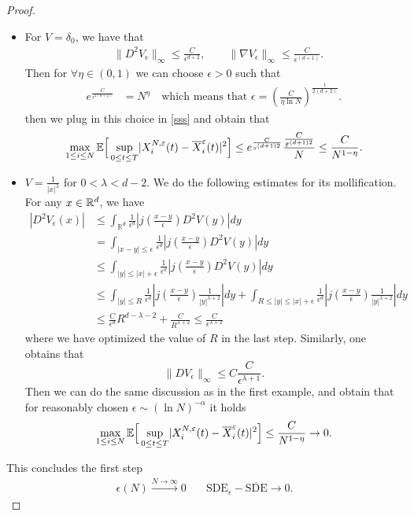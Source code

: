 \begin{proof}
\begin{itemize}
  \item For $V=\delta_0$, we have that 
 \begin{align*}
  &\|D^2 V_{\epsilon}\|_{\infty} \le  \frac{C}{\epsilon^{d+2}},\qquad\|\nabla V_{\epsilon}\|_{\infty} \le  \frac{C}{\epsilon ^{(d+1)} }
 .\end{align*}
 Then for $ \forall \eta  \in  (0,1)$ we can choose $\epsilon>0$ such that
  \begin{align*}
   e^{\frac{C}{\epsilon ^{2(d+2)} }} &= N^{\eta} \quad \mbox{which means that }
   \epsilon = (\frac{C}{\eta  \ln  N})^{\frac{1}{2(d+2)}}  
 .\end{align*}
 then we plug in this choice in \autoref{sss} and obtain that
 \begin{align*}
 \max_{1 \le i \le N}\mathbb{E}\Big[\sup_{0\leq t\leq T}\lvert X_i^{N,\varepsilon}(t) - \overline{X}_{i}^{\varepsilon}(t)\rvert^2 \Big ] \le  e^{\frac{C}{\varepsilon ^{(d+1)2} }} \frac{\frac{C}{\varepsilon ^{(d+1)2} }}{N}  \le \frac{C}{N^{1-\eta } }
 .\end{align*}
\item $V=\frac{1}{|x|^\lambda}$ for $0<\lambda<d-2$. We do the following estimates for its mollification. For any $x\in\mathbb{R}^d$, we have
\begin{align*}
|D^2 V_\epsilon(x)| &\leq \int_{\mathbb{R}^{d} }\frac{1}{\epsilon^{d}}|j(\frac{x-y}{\epsilon})D^2V(y)| dy\\
&=\int_{|x-y|\leq \epsilon }\frac{1}{\epsilon^{d}}|j(\frac{x-y}{\epsilon})D^2V(y)| dy\\
&\leq \int_{|y|\leq |x|+\epsilon }\frac{1}{\epsilon^{d}}|j(\frac{x-y}{\epsilon})D^2V(y)| dy\\
&\leq \int_{|y|\leq R}\frac{1}{\epsilon^{d}}|j(\frac{x-y}{\epsilon})\frac{1}{|y|^{\lambda+2}}| dy+\int_{R\leq |y|\leq |x|+\epsilon }\frac{1}{\epsilon^{d}}|j(\frac{x-y}{\epsilon})\frac{1}{|y|^{\lambda+2}}| dy\\
&\leq \frac{C}{\epsilon^{d}} R^{d-\lambda-2}+\frac{C}{R^{\lambda+2}}\leq \frac{C}{\epsilon^{\lambda+2}}
\end{align*} 
where we have optimized the value of $R$ in the last step. Similarly, one obtains that 
$$
\|D V_{\epsilon}\|_{\infty}\le C\frac{C}{\epsilon^{\lambda+1}}.
$$
Then we can do the same discussion as in the first example, and obtain that for reasonably chosen $\epsilon \sim (\ln N)^{-\alpha } $ it holds
\begin{align*}
 \max_{1 \le i \le N}\mathbb{E}\Big[\sup_{0\leq t\leq T}\lvert X_i^{N,\varepsilon}(t) - \overline{X}_{i}^{\varepsilon}(t)\rvert^2 \Big ] \le \frac{C}{N^{1-\eta } } \to  0
.\end{align*}
\end{itemize}
This concludes the first step
\begin{align*}
  \epsilon(N) \xrightarrow{N\to \infty} 0   \quad &\text{SDE}_\epsilon - \overline{\text{SDE}} \to 0 
.\end{align*}


\end{proof}
